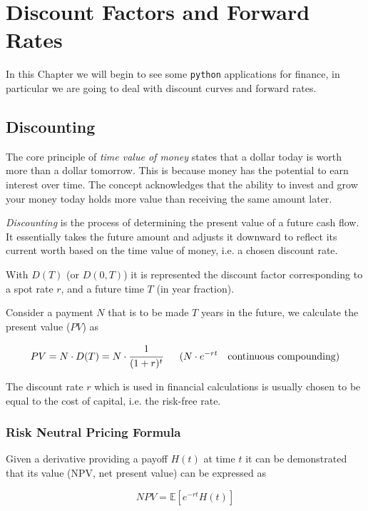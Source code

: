 \chapter{Discount Factors and Forward Rates}

In this Chapter we will begin to see some \texttt{python} applications for finance, in particular we are going to deal with discount curves and forward rates.

\section{Discounting}
\label{discount-factors}

The core principle of \emph{time value of money} states that a dollar today is worth more than a dollar tomorrow. This is because money has the potential to earn interest over time.
The concept acknowledges that the ability to invest and grow your money today holds more value than receiving the same amount later.

\emph{Discounting} is the process of determining the present value of a future cash flow. It essentially takes the future amount and adjusts it downward to reflect its current worth based on the time value of money, i.e. a chosen discount rate.

With $D(T)$ (or $D(0,T)$) it is represented the discount factor corresponding to a spot rate $r$, and a future time $T$ (in year fraction). 

Consider a payment $N$ that is to be made $T$ years in the future, we calculate the present value ($PV$) as

\begin{equation}
PV = N\cdot D(T) = N \cdot \cfrac{1}{(1 + r)^t}~~~~~
(N \cdot e^{-rt}~~~\text{continuous compounding})
\label{eq:discount_factor}
\end{equation}

The discount rate $r$ which is used in financial calculations is usually chosen to be equal to the cost of capital, i.e. the risk-free rate.

\subsection{Risk Neutral Pricing Formula}

Given a derivative providing a payoff $H(t)$ at time $t$ it can be demonstrated that its value (NPV, net present value) can be expressed as

\begin{equation}
NPV = \mathbb{E}[e^{-rt} H(t)]
\end{equation}

